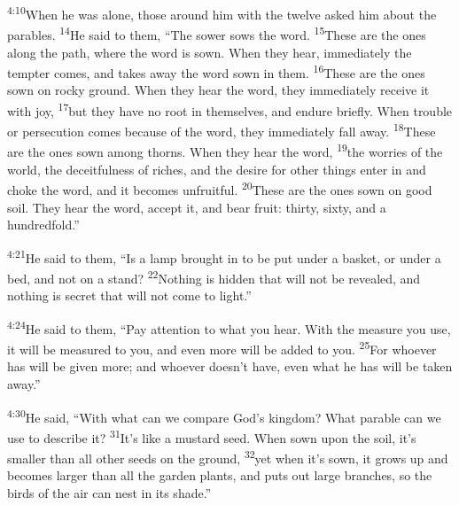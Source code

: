 \documentclass[openany,12pt,english]{book}
\newenvironment{para}{\par\pretolerance=100\tolerance=200\setlength{\emergencystretch}{0.6em}\relax}{\par}
\begin{document}
\begin{para}
    \textsuperscript{4:10}\thinspace{}When he was a\-lone, those a\-round him with the twelve asked him a\-bout the parables.
    \textsuperscript{14}\thinspace{}He said to them, “The sower sows the word.
    \textsuperscript{15}\thinspace{}These are the ones a\-long the path, where the word is sown. When they hear, im\-me\-di\-ate\-ly the temp\-ter co\-mes, and takes a\-way the word sown in them.
    \textsuperscript{16}\thinspace{}These are the ones sown on rock\-y ground. When they hear the word, they im\-me\-di\-ate\-ly re\-ceive it with joy,
    \textsuperscript{17}\thinspace{}but they have no root in them\-selves, and en\-dure brief\-ly. When trou\-ble or per\-se\-cu\-tion co\-mes be\-cause of the word, they im\-me\-di\-ate\-ly fall a\-way.
    \textsuperscript{18}\thinspace{}These are the ones sown a\-mong thorns. When they hear the word,
    \textsuperscript{19}\thinspace{}the worries of the world, the de\-ceit\-ful\-ness of rich\-es, and the de\-sire for oth\-er things en\-ter in and choke the word, and it becomes un\-fruit\-ful.
    \textsuperscript{20}\thinspace{}These are the ones sown on good soil. They hear the word, ac\-cept it, and bear fruit: thir\-ty, six\-ty, and a hun\-dred\-fold.”
\end{para}

\bigskip{}

\begin{para}
    \textsuperscript{4:21}\thinspace{}He said to them, “Is a lamp brought in to be put un\-der a bas\-ket, or un\-der a bed, and not on a stand?
    \textsuperscript{22}\thinspace{}Noth\-ing is hid\-den that will not be revealed, and noth\-ing is se\-cret that will not come to light.”
\end{para}

\begin{para}
    \textsuperscript{4:24}\thinspace{}He said to them, “Pay at\-ten\-tion to what you hear. With the meas\-ure you use, it will be meas\-ured to you, and e\-ven more will be added to you.
    \textsuperscript{25}\thinspace{}For who\-ev\-er has will be giv\-en more; and who\-ev\-er does\-n't have, e\-ven what he has will be tak\-en a\-way.”
\end{para}

\bigskip{}

\begin{para}
    \textsuperscript{4:30}\thinspace{}He said, “With what can we com\-pare God's king\-dom? What par\-a\-ble can we use to de\-scribe it?
    \textsuperscript{31}\thinspace{}It's like a mus\-tard seed. When sown up\-on the soil, it's smaller than all oth\-er seeds on the ground,
    \textsuperscript{32}\thinspace{}yet when it's sown, it grows up and becomes larg\-er than all the gar\-den plants, and puts out large branches, so the birds of the air can nest in its shade.”
\end{para}
\end{document}
